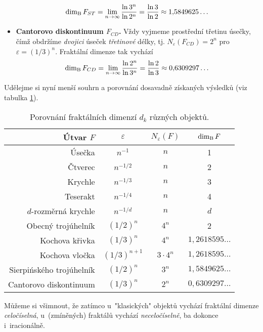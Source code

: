 \begin{itemize}
    \begin{equation}\label{eq:sierpinskeho-trojuhelnik-dimenze}
        \operatorname{dim_B}{F_{ST}}=\lim_{n\to\infty}{\dfrac{\ln{3^n}}{\ln{2^{n}}}}=\dfrac{\ln{3}}{\ln{2}}\approx 1{,}5849625\dots
    \end{equation}
    \item \textbf{Cantorovo diskontinuum $F_{CD}$.} Vždy vyjmeme prostřední třetinu úsečky, čímž obdržíme \emph{dvojici} úseček \emph{třetinové} délky, tj. $N_\varepsilon(F_{CD})=2^n$ pro $\varepsilon=(1/3)^n$. Fraktální dimenze tak vychází
    \begin{equation}\label{eq:cantorovo-diskontinuum-dimenze}
        \operatorname{dim_B}{F_{CD}}=\lim_{n\to\infty}{\dfrac{\ln{2^n}}{\ln{3^n}}}=\dfrac{\ln{2}}{\ln{3}}\approx 0{,}6309297\dots
    \end{equation}
\end{itemize}
Udělejme si nyní menší souhrn a porovnání dosavadně získaných výsledků (viz tabulka \ref{table:fraktaly-eukleides-dimenze}).
\begin{table}[h]
    \centering
    \begin{tabular}{r|ccc}
        Útvar $F$                & $\varepsilon$ & $N_\varepsilon(F)$ & $\operatorname{dim_B}{F}$         \\ \hline
        Úsečka                   & $n^{-1}$      & $n$                & 1                  \\
        Čtverec                  & $n^{-1/2}$    & $n$                & 2                  \\
        Krychle                  & $n^{-1/3}$    & $n$                & 3                  \\
        Teserakt                 & $n^{-1/4}$    & $n$                & 4                  \\
        $d$-rozměrná krychle     & $n^{-1/d}$    & $n$                & $d$                \\
        Obecný trojúhelník       & $(1/2)^n$     & $4^n$              & 2                  \\
        Kochova křivka           & $(1/3)^n$     & $4^n$              & $1{,}2618595\dots$ \\
        Kochova vločka           & $(1/3)^{n+1}$ & $3\cdot 4^n$       & $1{,}2618595\dots$ \\
        Sierpińského trojúhelník & $(1/2)^n$     & $3^n$              & $1{,}5849625\dots$ \\
        Cantorovo diskontinuum   & $(1/3)^n$     & $2^n$              & $0{,}6309297\dots$ \\
    \end{tabular}
    \caption{Porovnání fraktálních dimenzí $d_k$ různých objektů.}
    \label{table:fraktaly-eukleides-dimenze}
\end{table}
Můžeme si všimnout, že zatímco u~"klasických" objektů vychází fraktální dimenze \emph{celočíselná}, u~(zmíněných) fraktálů vychází \emph{neceločíselně}, ba dokonce i~iracionálně.

